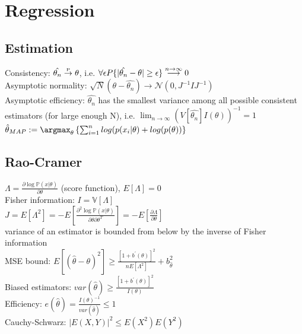 \section{Regression}
\subsection*{Estimation}
Consistency: $\hat{\theta_n} \stackrel{\text{\tiny P}}{\rightarrow} \theta$,
i.e. $\forall\epsilon P \{|\hat{\theta_n}-\theta| \geq\epsilon\} \stackrel{\tiny n \to\infty}{\longrightarrow} 0 $\\
Asymptotic normality: $\sqrt{N}(\theta - \hat{\theta_n}) \to \mathcal{N}(0, J^{-1}IJ^{-1})$ \\
Asymptotic efficiency: $\hat{\theta_n}$ has the smallest variance among all possible consistent estimators (for large enough N), i.e. $\lim_{n\to\infty} (V[\hat{\theta_n}]I(\theta))^{-1} = 1$
	$\hat{\theta}_{MAP} := \argmax_\theta \left \{ \sum_{i=1}^n log(p(x_i | \theta) + log(p(\theta)) \right\}$
\subsection*{Rao-Cramer}
$\Lambda = \frac{\partial \log \mathbb{P}(x|\theta )}{\partial \theta}$ (score function), $E[\Lambda ]=0$\\
Fisher information: $I= \mathbb{V}[\Lambda]$ \\
$J= E[\Lambda^{2}]= -E[\frac{\partial^2 \log \mathbb{P}(x|\theta ) }{\partial \theta \partial \theta ^{T}}]= -E[\frac{\partial \Lambda}{\partial \theta}]$ \\
variance of an estimator is bounded from below by the inverse of Fisher information \\
MSE bound: $E[(\hat \theta -\theta )^{2}] \geq \frac{[1 + b^{\prime} (\theta)]^{2}}{n E[\Lambda ^{2}]} + b_{\hat \theta}^{2}$ \\
Biased estimators: $var(\hat{\theta}) \geq \frac{[1 + b^{\prime}(\theta)]^2}{I(\theta)}$ \\
Efficiency: $e(\hat{\theta}) = \frac{I(\theta)^{-1}}{var(\hat{\theta})} \leq 1$ \\
Cauchy-Schwarz: $|E(X,Y)|^2 \leq E(X^2) E(Y^2)$ 

